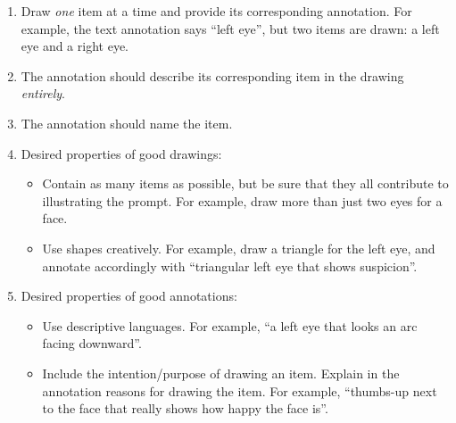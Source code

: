 

\begin{enumerate}
\item Draw \textit{one} item at a time and provide its corresponding annotation. For example, the text annotation says ``left eye'', but two items are drawn: a left eye and a right eye.
\item The annotation should describe its corresponding item in the drawing \textit{entirely}.
\item The annotation should name the item.
\item Desired properties of good drawings:
\begin{itemize}
    \item Contain as many items as possible, but be sure that they all contribute to illustrating the prompt. For example, draw more than just two eyes for a face.
    \item Use shapes creatively. For example, draw a triangle for the left eye, and annotate accordingly with ``triangular left eye that shows suspicion''.
\end{itemize}
\item Desired properties of good annotations:
\begin{itemize}
    \item Use descriptive languages. For example, ``a left eye that looks an arc facing downward''.
    \item Include the intention/purpose of drawing an item. Explain in the annotation reasons for drawing the item. For example, ``thumbs-up next to the face that really shows how happy the face is''.
\end{itemize}
\end{enumerate}

